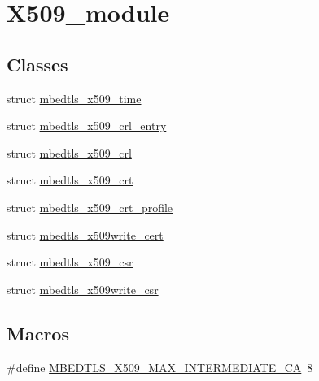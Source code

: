 \hypertarget{group__x509__module}{}\section{X509\+\_\+module}
\label{group__x509__module}
\subsection*{Classes}
\begin{DoxyCompactItemize}
\item 
struct \mbox{\hyperlink{structmbedtls__x509__time}{mbedtls\+\_\+x509\+\_\+time}}
\item 
struct \mbox{\hyperlink{structmbedtls__x509__crl__entry}{mbedtls\+\_\+x509\+\_\+crl\+\_\+entry}}
\item 
struct \mbox{\hyperlink{structmbedtls__x509__crl}{mbedtls\+\_\+x509\+\_\+crl}}
\item 
struct \mbox{\hyperlink{structmbedtls__x509__crt}{mbedtls\+\_\+x509\+\_\+crt}}
\item 
struct \mbox{\hyperlink{structmbedtls__x509__crt__profile}{mbedtls\+\_\+x509\+\_\+crt\+\_\+profile}}
\item 
struct \mbox{\hyperlink{structmbedtls__x509write__cert}{mbedtls\+\_\+x509write\+\_\+cert}}
\item 
struct \mbox{\hyperlink{structmbedtls__x509__csr}{mbedtls\+\_\+x509\+\_\+csr}}
\item 
struct \mbox{\hyperlink{structmbedtls__x509write__csr}{mbedtls\+\_\+x509write\+\_\+csr}}
\end{DoxyCompactItemize}
\subsection*{Macros}
\begin{DoxyCompactItemize}
\item 
\#define \mbox{\hyperlink{group__x509__module_gab98caf7dfede54b5c576b5a27a5c6a6a}{M\+B\+E\+D\+T\+L\+S\+\_\+\+X509\+\_\+\+M\+A\+X\+\_\+\+I\+N\+T\+E\+R\+M\+E\+D\+I\+A\+T\+E\+\_\+\+CA}}~8
\end{DoxyCompactItemize}
